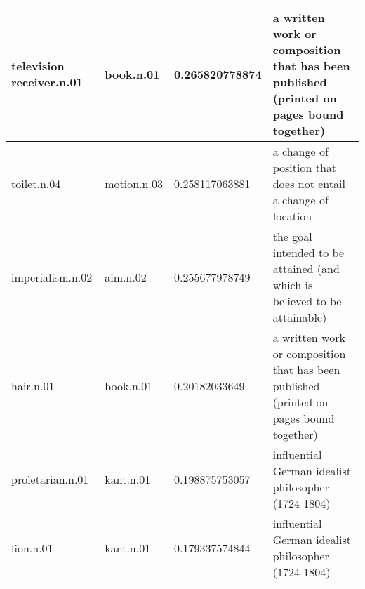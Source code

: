 \begin{center}
\begin{tabular}{ | l | l | l | l |}
television receiver.n.01 & book.n.01 & 0.265820778874 & a written work or composition that has been published (printed on pages bound together)\\ \hline
toilet.n.04 & motion.n.03 & 0.258117063881 & a change of position that does not entail a change of location\\ \hline
imperialism.n.02 & aim.n.02 & 0.255677978749 & the goal intended to be attained (and which is believed to be attainable)\\ \hline
hair.n.01 & book.n.01 & 0.20182033649 & a written work or composition that has been published (printed on pages bound together)\\ \hline
proletarian.n.01 & kant.n.01 & 0.198875753057 & influential German idealist philosopher (1724-1804)\\ \hline
lion.n.01 & kant.n.01 & 0.179337574844 & influential German idealist philosopher (1724-1804)\\ \hline
\end{tabular}
\end{center}